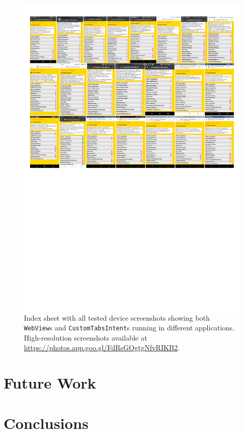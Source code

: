 \documentclass[sigconf]{acmart}
\begin{document}
\begin{figure}[htb]
  \begin{center}
  \centerline{\includegraphics[trim=.5cm 13.75cm .5cm .5cm, clip]{index-sheet.pdf}}
  \caption{Index sheet with all tested device screenshots showing both \texttt{WebView}s
    and \texttt{CustomTabsIntent}s running in different applications.
    High-resolution screenshots available at \url{https://photos.app.goo.gl/FdRsGOgtgNfvRIKB2}.}
  \label{fig:indexsheet}
  \end{center}
\end{figure}

\section{Future Work}
\label{sec:future-work}

\section{Conclusions}
\label{sec:conclusions}




\end{document}

